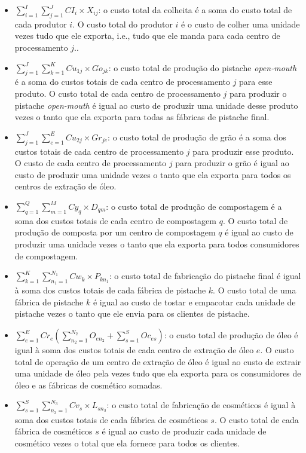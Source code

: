 \documentclass[]{article}
\begin{document}
			\begin{itemize}
				\item $\sum\limits_{i=1}^I\sum\limits_{j=1}^J CI_i\times X_{ij}$: o custo total da colheita é a soma do custo total de cada produtor $i$. O custo total do produtor $i$ é o custo de colher uma unidade vezes tudo que ele exporta, i.e., tudo que ele manda para cada centro de processamento $j$..
				\item $\sum\limits_{j=1}^J\sum\limits_{k=1}^K Cu_{1j}\times Go_{jk}$: o custo total de produção do pistache \textit{open-mouth} é a soma do custos totais de cada centro de processamento $j$ para esse produto. O custo total de cada centro de processamento $j$ para produzir o pistache \textit{open-mouth} é igual ao custo de produzir uma unidade desse produto vezes o tanto que ela exporta para todas as fábricas de pistache final.
				\item $\sum\limits_{j=1}^J\sum\limits_{e=1}^E Cu_{2j}\times Gr_{je}$: o custo total de produção de grão é a soma dos custos totais de cada centro de processamento $j$ para produzir esse produto. O custo de cada centro de processamento $j$ para produzir o grão é igual ao custo de produzir uma unidade vezes o tanto que ela exporta para todos os centros de extração de óleo.
				\item $\sum\limits_{q=1}^Q\sum\limits_{m=1}^M Cy_{q}\times D_{qm}$: o custo total de produção de compostagem é a soma dos custos totais de cada centro de compostagem $q$. O custo total de produção de composta por um centro de compostagem $q$ é igual ao custo de produzir uma unidade vezes o tanto que ela exporta para todos consumidores de compostagem.
				\item $\sum\limits_{k=1}^K\sum\limits_{n_1=1}^{N_1} Cw_{k}\times P_{kn_1}$: o custo total de fabricação do pistache final é igual à soma dos custos totais de cada fábrica de pistache $k$. O custo total de uma fábrica de pistache $k$ é igual ao custo de tostar e empacotar cada unidade de pistache vezes o tanto que ele envia para os clientes de pistache.
				\item $\sum\limits_{e=1}^E Cr_e\left(\sum\limits_{n_2=1}^{N_2}O_{en_2} + \sum\limits_{s=1}^S Oc_{es}\right)$: o custo total de produção de óleo é igual à soma dos custos totais de cada centro de extração de óleo $e$. O custo total de operação de um centro de extração de óleo é igual ao custo de extrair uma unidade de óleo pela vezes tudo que ela exporta para os consumidores de óleo e as fábricas de cosmético somadas.
				\item $\sum\limits_{s=1}^S\sum\limits_{n_3=1}^{N_3} Cv_{s}\times L_{sn_3}$: o custo total de fabricação de cosméticos é igual à soma dos custos totais de cada fábrica de cosméticos $s$. O custo total de cada fábrica de cosméticos $s$ é igual ao custo de produzir cada unidade de cosmético vezes o total que ela fornece para todos os clientes.
			\end{itemize}
		
\end{document}

